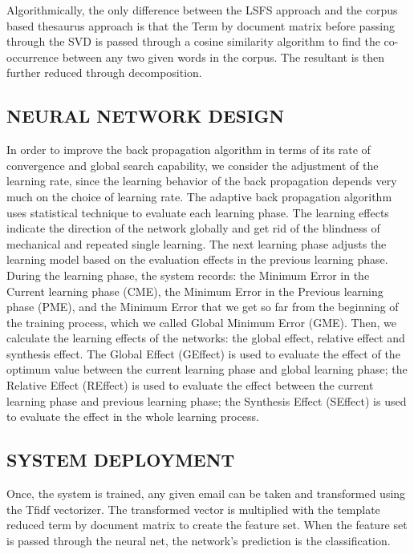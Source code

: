 Algorithmically, the only difference between the LSFS approach and the corpus based thesaurus approach is that the Term by document matrix before passing through the SVD is passed through a cosine similarity algorithm to find the co-occurrence between any two given words in the corpus. The resultant is then further reduced through decomposition.    

\subsection{NEURAL NETWORK DESIGN}
In order to improve the back propagation algorithm in terms of its rate of convergence and global search capability, we consider the adjustment of the learning rate, since the learning behavior of the back propagation depends very much on the choice of learning rate. The adaptive back propagation algorithm uses statistical technique to evaluate each learning phase. The learning effects indicate the direction of the network globally and get rid of the blindness of mechanical and repeated single learning. The next learning phase adjusts the learning model based on the evaluation effects in the previous learning phase. During the learning phase, the system records: the Minimum Error in the Current learning phase (CME), the Minimum Error in the Previous learning phase (PME), and the Minimum Error that we get so far from the beginning of the training process, which we called Global Minimum Error (GME). Then, we calculate the learning effects of the networks: the global effect, relative effect and synthesis effect. The Global Effect (GEffect) is used to evaluate the effect of the optimum value between the current learning phase and global learning phase; the Relative Effect (REffect) is used to evaluate the effect between the current learning phase and previous learning phase; the Synthesis Effect (SEffect) is used to evaluate the effect in the whole learning process. 

\subsection{SYSTEM DEPLOYMENT}

Once, the system is trained, any given email can be taken and transformed using the Tfidf vectorizer. The transformed vector is multiplied with the template reduced term by document matrix to create the feature set. When the feature set is passed through the neural net, the network’s prediction is the classification. 

